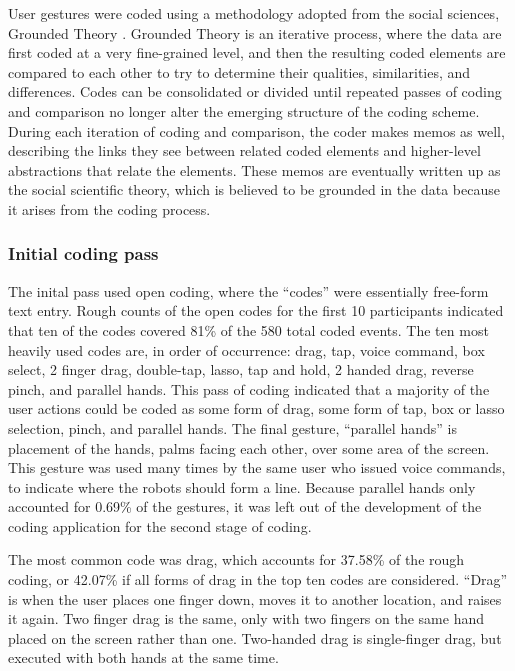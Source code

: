 User gestures were coded using a methodology adopted from the social sciences, Grounded Theory \citep{glaser2017discovery}.
Grounded Theory is an iterative process, where the data are first coded at a very fine-grained level, and then the resulting coded elements are compared to each other to try to determine their qualities, similarities, and differences. 
Codes can be consolidated or divided until repeated passes of coding and comparison no longer alter the emerging structure of the coding scheme. 
During each iteration of coding and comparison, the coder makes memos as well, describing the links they see between related coded elements and higher-level abstractions that relate the elements. 
These memos are eventually written up as the social scientific theory, which is believed to be grounded in the data because it arises from the coding process. 

\subsubsection{Initial coding pass}

The inital pass used open coding, where the ``codes'' were essentially free-form text entry. 
Rough counts of the open codes for the first 10 participants indicated that ten of the codes covered 81\% of the 580 total coded events. 
The ten most heavily used codes are, in order of occurrence: drag, tap, voice command, box select, 2 finger drag, double-tap, lasso, tap and hold, 2 handed drag, reverse pinch, and parallel hands. 
This pass of coding indicated that a majority of the user actions could be coded as some form of drag, some form of tap, box or lasso selection, pinch, and parallel hands. 
The final gesture, ``parallel hands'' is placement of the hands, palms facing each other, over some area of the screen. This gesture was used many times by the same user who issued voice commands, to indicate where the robots should form a line. Because parallel hands only accounted for 0.69\% of the gestures, it was left out of the development of the coding application for the second stage of coding. 

The most common code was drag, which accounts for 37.58\% of the rough coding, or 42.07\% if all forms of drag in the top ten codes are considered. ``Drag'' is when the user places one finger down, moves it to another location, and raises it again. Two finger drag is the same, only with two fingers on the same hand placed on the screen rather than one. Two-handed drag is single-finger drag, but executed with both hands at the same time. 

